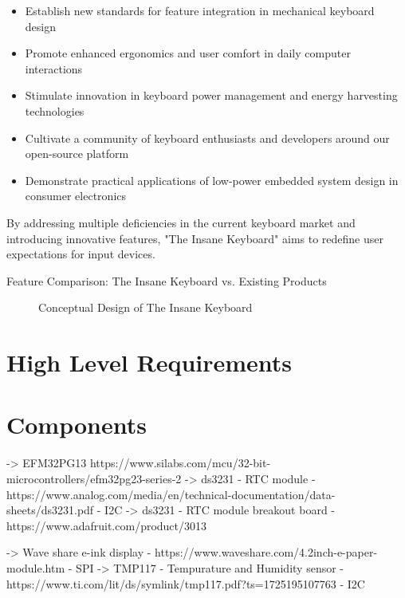 \documentclass[a4paper,11pt]{article}%
\begin{document}
\begin{itemize}
    \item Establish new standards for feature integration in mechanical keyboard design
    \item Promote enhanced ergonomics and user comfort in daily computer interactions
    \item Stimulate innovation in keyboard power management and energy harvesting technologies
    \item Cultivate a community of keyboard enthusiasts and developers around our open-source platform
    \item Demonstrate practical applications of low-power embedded system design in consumer electronics
\end{itemize}

By addressing multiple deficiencies in the current keyboard market and introducing innovative features, "The Insane Keyboard" aims to redefine user expectations for input devices.

\begin{table}[h]
    \centering
    \caption{Feature Comparison: The Insane Keyboard vs. Existing Products}
    \label{tab:feature-comparison}
\end{table}

\begin{figure}[h]
    \centering
    \caption{Conceptual Design of The Insane Keyboard}
    \label{fig:keyboard-design}
\end{figure}

\section{High Level Requirements}


\section{Components}

-> EFM32PG13  https://www.silabs.com/mcu/32-bit-microcontrollers/efm32pg23-series-2
-> ds3231 - RTC module - https://www.analog.com/media/en/technical-documentation/data-sheets/ds3231.pdf - I2C
-> ds3231 - RTC module breakout board - https://www.adafruit.com/product/3013

-> Wave share e-ink display - https://www.waveshare.com/4.2inch-e-paper-module.htm - SPI
-> TMP117 - Tempurature and Humidity sensor - https://www.ti.com/lit/ds/symlink/tmp117.pdf?ts=1725195107763 - I2C
\end{document}
